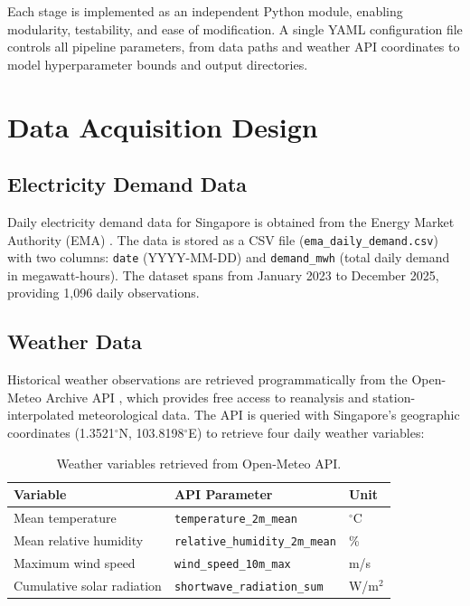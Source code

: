 Each stage is implemented as an independent Python module, enabling modularity, testability, and ease of modification. A single YAML configuration file controls all pipeline parameters, from data paths and weather API coordinates to model hyperparameter bounds and output directories.


\section{Data Acquisition Design}\label{sec:data_design}

\subsection{Electricity Demand Data}

Daily electricity demand data for Singapore is obtained from the Energy Market Authority (EMA) \parencite{ema2025statistics}. The data is stored as a CSV file (\texttt{ema\_daily\_demand.csv}) with two columns: \texttt{date} (YYYY-MM-DD) and \texttt{demand\_mwh} (total daily demand in megawatt-hours). The dataset spans from January 2023 to December 2025, providing 1,096 daily observations.

\subsection{Weather Data}

Historical weather observations are retrieved programmatically from the Open-Meteo Archive API \parencite{openmeteo2025api}, which provides free access to reanalysis and station-interpolated meteorological data. The API is queried with Singapore's geographic coordinates (1.3521$^\circ$N, 103.8198$^\circ$E) to retrieve four daily weather variables:

\begin{table}[H]
\centering
\caption{Weather variables retrieved from Open-Meteo API.}
\label{tab:weather_vars}
\begin{tabular}{@{}lll@{}}
\toprule
\textbf{Variable} & \textbf{API Parameter} & \textbf{Unit} \\
\midrule
Mean temperature & \texttt{temperature\_2m\_mean} & $^\circ$C \\
Mean relative humidity & \texttt{relative\_humidity\_2m\_mean} & \% \\
Maximum wind speed & \texttt{wind\_speed\_10m\_max} & m/s \\
Cumulative solar radiation & \texttt{shortwave\_radiation\_sum} & W/m$^2$ \\
\bottomrule
\end{tabular}
\end{table}

